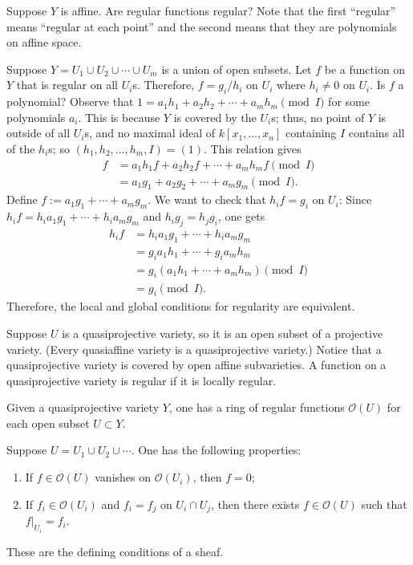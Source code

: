 \documentclass[11pt, oneside,margin=1in]{article}
\begin{document}
\begin{problem}
	Suppose $Y$ is affine. Are regular functions regular? Note that the first ``regular'' means ``regular at each point'' and the second means that they are polynomials on affine space.
\end{problem}

Suppose $Y=U_1\cup U_2\cup \cdots \cup U_m$ is a union of open subsets. Let $f$ be a function on $Y$ that is regular on all $U_i$s. Therefore, $f=g_i/h_i$ on $U_i$ where $h_i\ne 0 $ on $U_i$. Is $f$ a polynomial? Observe that $1= a_1h_1 + a_2h_2 + \cdots +a_mh_m\pmod I$ for some polynomials $a_i$. This is because $Y$ is covered by the $U_i$s; thus, no point of $Y$ is outside of all $U_i$s, and no maximal ideal of $k[x_1,\hdots,x_n]$ containing $I$ contains all of the $h_i$s; so $(h_1,h_2,\hdots, h_m, I)=(1)$. This relation gives
\begin{align*}
	f &= a_1h_1f + a_2h_2f + \cdots + a_mh_mf \pmod I\\
	  &= a_1g_1 + a_2g_2+\cdots + a_mg_m \pmod I.
\end{align*}
Define $f:= a_1g_1+\cdots + a_mg_m$. We want to check that $h_if = g_i$ on $U_i$: Since $h_if = h_ia_1g_1 +\cdots + h_ia_mg_m$ and $h_ig_j = h_jg_i$, one gets
\begin{align*}
	h_if &= h_ia_1g_1 +\cdots + h_ia_mg_m\\
	     &= g_ia_1h_1 + \cdots + g_ia_mh_m\\
	     &= g_i(a_1h_1+\cdots+a_mh_m)\pmod I\\
	     &= g_i \pmod I.
\end{align*}
Therefore, the local and global conditions for regularity are equivalent.

Suppose $U$ is a quasiprojective variety, so it is an open subset of a projective variety. (Every quasiaffine variety is a quasiprojective variety.) Notice that a quasiprojective variety is covered by open affine subvarieties. A function on a quasiprojective variety is  regular if it is locally regular.

Given a quasiprojective variety $Y$, one has a ring of regular functions $\mathscr{O}(U)$ for each open subset $U\subset Y$. 

Suppose $U= U_1\cup U_2\cup \cdots$. One has the following properties:
\begin{enumerate}
	\item If $f\in \mathscr{O}(U) $ vanishes on $\mathscr{O}(U_i) $, then $f = 0$;
	\item If $f_i\in \mathscr{O}(U_i) $ and $f_i = f_j$ on $U_i\cap U_j$, then there exists $f\in \mathscr{O}(U) $ such that $f \big |_{U_i} = f_i$.
\end{enumerate}
These are the defining conditions of a sheaf.
\end{document}
